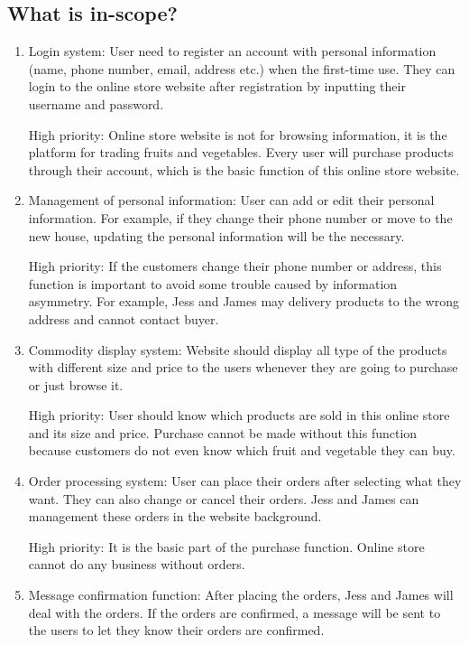 \documentclass{report}
\begin{document}
\subsection{What is in-scope?}
\begin{enumerate}
  \item Login system: User need to register an account with personal information (name, phone number, email, address etc.) when the first-time use. They can login to the online store website after registration by inputting their username and password.
  
  High priority: Online store website is not for browsing information, it is the platform for trading fruits and vegetables. Every user will purchase products through their account, which is the basic function of this online store website.

  \item Management of personal information: User can add or edit their personal information. For example, if they change their phone number or move to the new house, updating the personal information will be the necessary.
  
  High priority: If the customers change their phone number or address, this function is important to avoid some trouble caused by information asymmetry. For example, Jess and James may delivery products to the wrong address and cannot contact buyer.
  
  \item Commodity display system: Website should display all type of the products with different size and price to the users whenever they are going to purchase or just browse it.
  
  High priority: User should know which products are sold in this online store and its size and price. Purchase cannot be made without this function because customers do not even know which fruit and vegetable they can buy.
  
  \item Order processing system: User can place their orders after selecting what they want. They can also change or cancel their orders. Jess and James can management these orders in the website background.
  
  High priority: It is the basic part of the purchase function. Online store cannot do any business without orders.
  
  \item Message confirmation function: After placing the orders, Jess and James will deal with the orders. If the orders are confirmed, a message will be sent to the users to let they know their orders are confirmed.
  

\end{enumerate}
\end{document}
